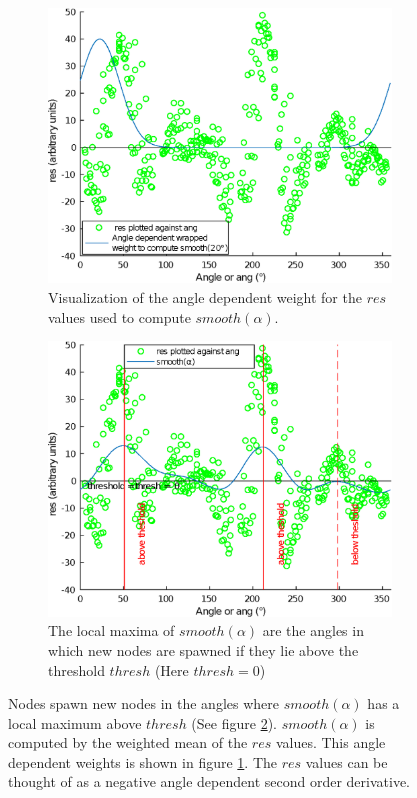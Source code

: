 \documentclass[12pt,english,twocolumn]{revtex4}
\begin{document}
\begin{figure}[h!]
	\begin{subfigure}[b]{\linewidth}
	    \includegraphics[width=\linewidth]{figures/ang_fun1.eps}
	    \caption{Visualization of the angle dependent weight for the $res$ values used to compute $smooth(\alpha)$.}
	    \label{subfig:smooth_weight1}
	\end{subfigure}
	\begin{subfigure}[b]{\linewidth}
	    \includegraphics[width=\linewidth]{figures/ang_fun2.eps}
	    \caption{The local maxima of $smooth(\alpha)$ are the angles in which new nodes are spawned if they lie above the threshold $thresh$ (Here $thresh = 0$)}
	    \label{subfig:smooth_weight2}
	\end{subfigure}
    \caption{Nodes spawn new nodes in the angles where $smooth(\alpha)$ has a local maximum above $thresh$ (See figure \ref{subfig:smooth_weight2}). $smooth(\alpha)$ is computed by the weighted mean of the $res$ values. This angle dependent weights is shown in figure \ref{subfig:smooth_weight1}. The $res$ values can be thought of as a negative angle dependent second order derivative.}
    \label{fig:smooth_weight}
\end{figure}
\end{document}
